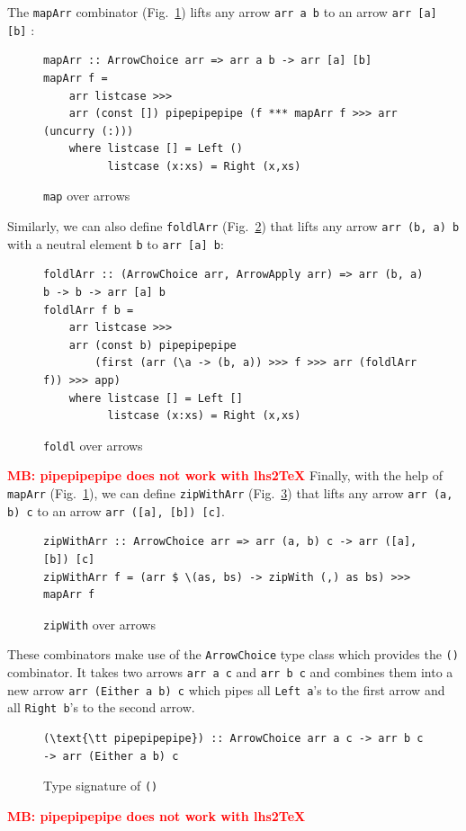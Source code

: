 \documentclass{jfp1}
\renewcommand{\cite}[1]{\citep{#1}}
\newcommand{\inlinecode}[1]{\texttt{#1}}
\newcommand{\comm}[2]{\textcolor{red}{\bfseries #1: #2}}
\newcommand{\mbcomment}[1]{\comm{MB}{#1}}
\newcommand{\fixme}{\mbcomment}
\begin{document}
The \inlinecode{mapArr} combinator (Fig.~\ref{fig:mapArr}) lifts any arrow \inlinecode{arr a b} to an arrow \inlinecode{arr [a] [b]} \cite{programming_with_arrows}:
\begin{figure}[h]
\begin{lstlisting}[frame=htrbl]
mapArr :: ArrowChoice arr => arr a b -> arr [a] [b]
mapArr f =
	arr listcase >>>
	arr (const []) pipepipepipe (f *** mapArr f >>> arr (uncurry (:)))
	where listcase [] = Left ()
	      listcase (x:xs) = Right (x,xs)
\end{lstlisting}
\caption{\inlinecode{map} over arrows}
\label{fig:mapArr}
\end{figure}
Similarly, we can also define \inlinecode{foldlArr} (Fig.~\ref{fig:foldlArr}) that lifts any arrow \inlinecode{arr (b, a) b} with a neutral element \inlinecode{b} to \inlinecode{arr [a] b}:
\begin{figure}[h]
\begin{lstlisting}[frame=htrbl]
foldlArr :: (ArrowChoice arr, ArrowApply arr) => arr (b, a) b -> b -> arr [a] b
foldlArr f b =
	arr listcase >>>
	arr (const b) pipepipepipe
		(first (arr (\a -> (b, a)) >>> f >>> arr (foldlArr f)) >>> app)
	where listcase [] = Left []
	      listcase (x:xs) = Right (x,xs)
\end{lstlisting}
\caption{\inlinecode{foldl} over arrows}
\label{fig:foldlArr}
\end{figure}
\fixme{pipepipepipe does not work with lhs2TeX}
Finally, with the help of \inlinecode{mapArr} (Fig.~\ref{fig:mapArr}), we can define \lstinline{zipWithArr} (Fig.~\ref{fig:zipWithArr}) that lifts any arrow \inlinecode{arr (a, b) c} to an arrow \inlinecode{arr ([a], [b]) [c]}.
\begin{figure}[h]
\begin{lstlisting}[frame=htrbl]
zipWithArr :: ArrowChoice arr => arr (a, b) c -> arr ([a], [b]) [c]
zipWithArr f = (arr $ \(as, bs) -> zipWith (,) as bs) >>> mapArr f
\end{lstlisting}
\caption{\inlinecode{zipWith} over arrows}
\label{fig:zipWithArr}
\end{figure}
These combinators make use of the \inlinecode{ArrowChoice} type class which provides the \inlinecode{(\textpipe\textpipe\textpipe)} combinator. It takes two arrows \inlinecode{arr a c} and \inlinecode{arr b c} and combines them into a new arrow \inlinecode{arr (Either a b) c} which pipes all \inlinecode{Left a}'s to the first arrow and all \inlinecode{Right b}'s to the second arrow.
\begin{figure}[h]
\begin{lstlisting}[frame=htrbl]
(\text{\tt pipepipepipe}) :: ArrowChoice arr a c -> arr b c -> arr (Either a b) c
\end{lstlisting}
\caption{Type signature of \inlinecode{(\textpipe\textpipe\textpipe)}}
\label{fig:codeSigPipePipePipe}
\end{figure}
\fixme{pipepipepipe does not work with lhs2TeX}
\end{document}
